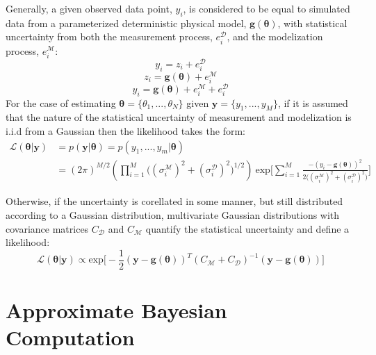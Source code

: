 Generally, a given observed data point, $y_i$, is considered to be equal to simulated data from a parameterized deterministic physical model, $\bm{g}(\bm{\theta})$, with statistical uncertainty from both the measurement process, $e^{\mathcal{D}}_i$, and the modelization process, $e^{\mathcal{M}}_i$:
\begin{equation}
y_i = z_i + e^{\mathcal{D}}_i
\end{equation}
\begin{equation}
z_i = \bm{g}(\bm{\theta}) + e^{\mathcal{M}}_i
\end{equation}
\begin{equation}
y_i = \bm{g}(\bm{\theta}) + e^{\mathcal{M}}_i + e^{\mathcal{D}}_i
\end{equation}
For the case of estimating $\bm{\theta} = \{\theta_1,...,\theta_N\}$ given $\bm{y} = \{y_1,...,y_M\}$, if it is assumed that the nature of the statistical uncertainty of measurement and modelization is i.i.d from a Gaussian then the likelihood takes the form: 
\begin{equation}
\begin{split}
\mathcal{L}(\bm{\theta}|\bm{y}) &= p(\bm{y}|\bm{\theta}) = p(y_1,...,y_m|\bm{\theta})\\
&= (2\pi)^{M/2}(\prod_{i = 1}^{M}\big((\sigma^{\mathcal{M}}_i)^2+(\sigma^{\mathcal{D}}_i)^2\big)^{1/2})\ \text{exp}\bigg[\sum_{i = 1}^{M}\frac{-(y_i-\bm{g}({\bm{\theta}}))^2}{2\big((\sigma^{\mathcal{M}}_i)^2+(\sigma^{\mathcal{D}}_i)^2\big)}\bigg]
\end{split}
\label{likelihood-1}
\end{equation}

Otherwise, if the uncertainty is corellated in some manner, but still distributed according to a Gaussian distribution, multivariate Gaussian distributions with covariance matrices $C_{\mathcal{D}}$ and $C_{\mathcal{M}}$ quantify the statistical uncertainty and define a likelihood:
\begin{equation}
\mathcal{L}(\bm{\theta}|\bm{y}) \propto \text{exp}\bigg[-\frac{1}{2}(\bm{y}-\bm{g}(\bm{\theta}))^T(C_{\mathcal{M}}+C_{\mathcal{D}})^{-1}(\bm{y}-\bm{g}(\bm{\theta}))\bigg]
\label{likelihood-2}
\end{equation}



\section{Approximate Bayesian Computation}

